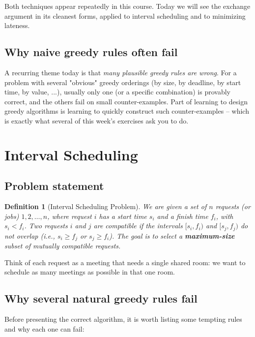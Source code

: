\documentclass[11pt]{article}
\newtheorem{definition}[theorem]{Definition}
\begin{document}
Both techniques appear repeatedly in this course. Today we will see the exchange argument
in its cleanest forms, applied to interval scheduling and to minimizing lateness.

\subsection{Why naive greedy rules often fail}

A recurring theme today is that \emph{many plausible greedy rules are wrong}. For a
problem with several "obvious" greedy orderings (by size, by deadline, by start time, by
value, ...), usually only one (or a specific combination) is provably correct, and the
others fail on small counter-examples. Part of learning to design greedy algorithms is
learning to quickly construct such counter-examples -- which is exactly what several of
this week's exercises ask you to do.

\section{Interval Scheduling}

\subsection{Problem statement}

\begin{definition}[Interval Scheduling Problem]
We are given a set of $n$ \emph{requests} (or \emph{jobs}) $1, 2, \ldots, n$, where request
$i$ has a \emph{start time} $s_i$ and a \emph{finish time} $f_i$, with $s_i < f_i$. Two
requests $i$ and $j$ are \emph{compatible} if the intervals $[s_i, f_i)$ and $[s_j, f_j)$
do not overlap (i.e., $s_i \ge f_j$ or $s_j \ge f_i$). The goal is to select a
\textbf{maximum-size} subset of mutually compatible requests.
\end{definition}

Think of each request as a meeting that needs a single shared room: we want to schedule as
many meetings as possible in that one room.

\subsection{Why several natural greedy rules fail}

Before presenting the correct algorithm, it is worth listing some tempting rules and why
each one can fail:
\end{document}
